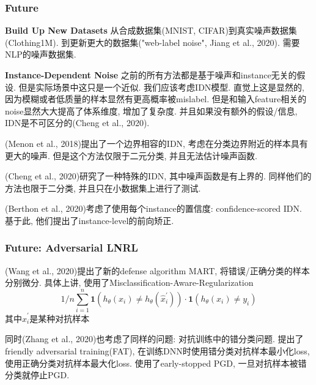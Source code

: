 \documentclass{beamer}
\newcommand{\bt}[1]{\textbf{#1}}
\begin{document}
\begin{frame}
    \frametitle{Future}

    \bt{Build Up New Datasets} 从合成数据集(MNIST, CIFAR)到真实噪声数据集(Clothing1M). 到更新更大的数据集("web-label noise", Jiang et al., 2020). 需要NLP的噪声数据集.

    \bt{Instance-Dependent Noise} 之前的所有方法都是基于噪声和instance无关的假设. 但是实际场景中这只是一个近似. 我们应该考虑IDN模型. 直觉上这是显然的, 因为模糊或者低质量的样本显然有更高概率被mislabel. 但是和输入feature相关的noise显然大大提高了体系维度, 增加了复杂度. 并且如果没有额外的假设/信息, IDN是不可区分的(Cheng et al., 2020).

    (Menon  et  al., 2018)提出了一个边界相容的IDN, 考虑在分类边界附近的样本具有更大的噪声. 但是这个方法仅限于二元分类, 并且无法估计噪声函数.

    (Cheng et al., 2020)研究了一种特殊的IDN, 其中噪声函数是有上界的. 同样他们的方法也限于二分类, 并且只在小数据集上进行了测试.

    (Berthon et al., 2020)考虑了使用每个instance的置信度: confidence-scored IDN. 基于此, 他们提出了instance-level的前向矫正.

\end{frame}

\begin{frame}
    \frametitle{Future: Adversarial LNRL}

    (Wang  et  al., 2020)提出了新的defense algorithm MART, 将错误/正确分类的样本分别微分. 具体上讲, 使用了Misclassification-Aware-Regularization 
    \begin{equation}
        1 / n \sum_{i=1}^{n} \mathbf{1}\left(h_{\theta}\left(x_{i}\right) \neq h_{\theta}\left(\hat{x}_{i}^{\prime}\right)\right) \cdot \mathbf{1}\left(h_{\theta}\left(x_{i}\right) \neq y_{i}\right)
    \end{equation}
    其中$\hat{x}_{i}^{\prime}$是某种对抗样本\footnotemark

    同时(Zhang et al., 2020)也考虑了同样的问题: 对抗训练中的错分类问题. 提出了friendly adversarial training(FAT), 在训练DNN时使用错分类对抗样本最小化loss, 使用正确分类对抗样本最大化loss. 使用了early-stopped PGD, 一旦对抗样本被错分类就停止PGD.

\end{frame}
\end{document}
